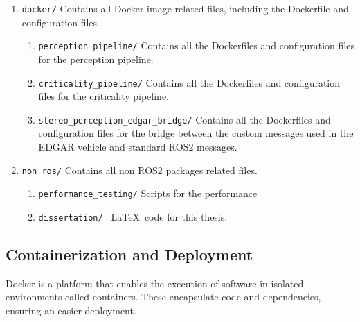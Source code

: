 \begin{enumerate}
\begin{enumerate}
\begin{enumerate}
      \item \texttt{disparity\_to\_depth/} Package that converts disparity images to depth images.
      \item \texttt{stereo\_perception\_edgar\_bridge/} Package that contains a bridge between the custom messages used in the EDGAR vehicle and standard ROS2 messages
      \item \texttt{tod\_msgs/} Custom messages used in the EDGAR vehicle (git submodule).
      \item \texttt{tum\_msgs/} Custom messages used in the EDGAR vehicle (git submodule).
    \end{enumerate}
  \end{enumerate}
  \item \texttt{docker/} Contains all Docker image related files, including the Dockerfile and configuration files.
  \begin{enumerate}
    \item \texttt{perception\_pipeline/} Contains all the Dockerfiles and configuration files for the perception pipeline.
    \item \texttt{criticality\_pipeline/} Contains all the Dockerfiles and configuration files for the criticality pipeline.
    \item \texttt{stereo\_perception\_edgar\_bridge/} Contains all the Dockerfiles and configuration files for the bridge between the custom messages used in the EDGAR vehicle and standard ROS2 messages.
  \end{enumerate}
  \item \texttt{non\_ros/} Contains all non ROS2 packages related files.
  \begin{enumerate} 
    \item \texttt{performance\_testing/} Scripts for the performance
    \item \texttt{dissertation/ } \LaTeX~code for this thesis.
  \end{enumerate}
\end{enumerate}


\subsection{Containerization and Deployment}\label{sec:Containerization}

Docker is a platform that enables the execution of software in isolated 
environments called containers. These encapsulate code and dependencies, 
ensuring an easier deployment. 

